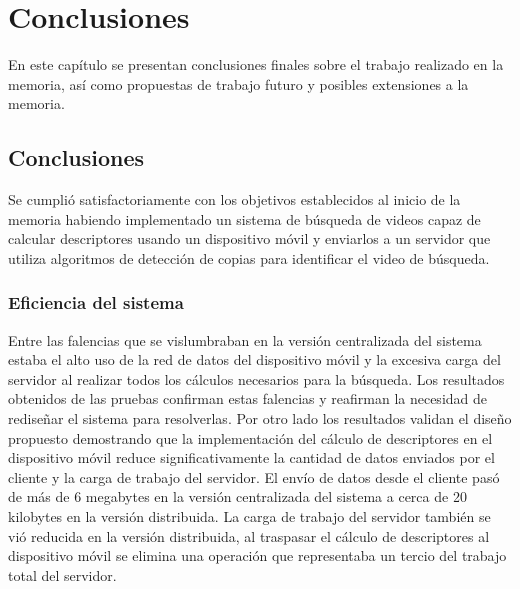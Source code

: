 
\chapter{Conclusiones}\label{cap_conclusiones}
En este capítulo se presentan conclusiones finales sobre el trabajo realizado en la memoria, así como propuestas de trabajo futuro y posibles extensiones a la memoria.

\section{Conclusiones}\label{conclusiones}

Se cumplió satisfactoriamente con los objetivos establecidos al inicio de la memoria habiendo implementado un sistema de búsqueda de videos capaz de calcular descriptores usando un dispositivo móvil y enviarlos a un servidor que utiliza algoritmos de detección de copias para identificar el video de búsqueda.

\subsection*{Eficiencia del sistema}
Entre las falencias que se vislumbraban en la versión centralizada del sistema estaba el alto uso de la red de datos del dispositivo móvil y la excesiva carga del servidor al realizar todos los cálculos necesarios para la búsqueda. Los resultados obtenidos de las pruebas confirman estas falencias y reafirman la necesidad de rediseñar el sistema para resolverlas. Por otro lado los resultados validan el diseño propuesto demostrando que la implementación del cálculo de descriptores en el dispositivo móvil reduce significativamente la cantidad de datos enviados por el cliente y la carga de trabajo del servidor. El envío de datos desde el cliente pasó de más de 6 megabytes en la versión centralizada del sistema a cerca de 20 kilobytes en la versión distribuida. La carga de trabajo del servidor también se vió reducida en la versión distribuida, al traspasar el cálculo de descriptores al dispositivo móvil se elimina una operación que representaba un tercio del trabajo total del servidor.

